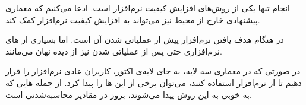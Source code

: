 
انجام  تنها یکی از روش‌های افزایش کیفیت نرم‌افزار است. ادعا می‌کنیم که معماری پیشنهادی خارج از محیط  نیز می‌تواند به افزایش کیفیت نرم‌افزار کمک کند.

در هنگام  هدف یافتن  نرم‌افزار پیش از عملیاتی شدن آن است. اما بسیاری از ‌های نرم‌افزاری حتی پس از عملیاتی شدن نیز از دیده نهان می‌مانند.

در صورتی که در معماری سه لایه، به جای لایه‌ی اکتور، کاربران عادی نرم‌افزار را قرار دهیم تا از نرم‌افزار استفاده کنند، می‌توان برخی از این ‌ها را پیدا کرد. از جمله ‌هایی که به خوبی به این روش پیدا می‌شوند، بروز  در مقادیر محاسبه‌شدنی است.
